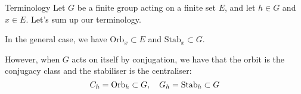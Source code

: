 \documentclass[a4paper]{article}
\begin{document}
\begin{parag}{Terminology}
    Let $G$ be a finite group acting on a finite set $E$, and let $h \in G$ and $x \in E$. Let's sum up our terminology.

    In the general case, we have $\text{Orb}_x \subset E$ and $\text{Stab}_x \subset G$. 

    However, when $G$ acts on itself by conjugation, we have that the orbit is the conjugacy class and the stabiliser is the centraliser: 
    \[C_h = \text{Orb}_h \subset G, \quad G_h = \text{Stab}_h \subset G\]
\end{parag}
\end{document}
